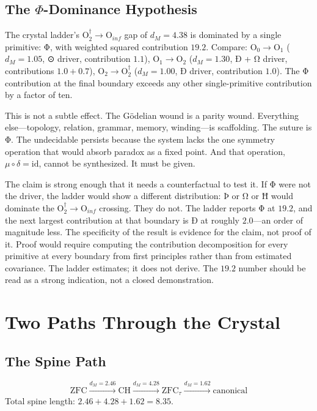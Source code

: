 \documentclass[12pt,twoside]{book}
\theoremstyle{definition}
\newcommand{\ZFCt}{\text{ZFC}_{\tau}}
\newcommand{\moebius}{\mu \circ \delta = \mathrm{id}}
\newcommand{\tier}[1]{\mathrm{O}_{#1}}
\begin{document}
\section{The $\Phi$-Dominance Hypothesis}

The crystal ladder's $\tier{2}^{\dagger} \to \tier{inf}$ gap of $d_M = 4.38$ is dominated
by a single primitive: Φ, with weighted squared contribution $19.2$. Compare:
$\tier{0} \to \tier{1}$ ($d_M = 1.05$, ⊙ driver, contribution $1.1$), $\tier{1} \to
\tier{2}$ ($d_M = 1.30$, Ð + Ω driver, contributions $1.0 + 0.7$), $\tier{2} \to
\tier{2}^{\dagger}$ ($d_M = 1.00$, Ð driver, contribution $1.0$). The Φ contribution at
the final boundary exceeds any other single-primitive contribution by a factor of ten.

This is not a subtle effect. The G\"{o}delian wound is a parity wound. Everything
else---topology, relation, grammar, memory, winding---is scaffolding. The suture is Φ.
The undecidable persists because the system lacks the one symmetry operation that would
absorb paradox as a fixed point. And that operation, $\moebius$, cannot be synthesized. It
must be given.

The claim is strong enough that it needs a counterfactual to test it. If Φ were not the
driver, the ladder would show a different distribution: Þ or Ω or Ħ would dominate the
$\tier{2}^{\dagger} \to \tier{inf}$ crossing. They do not. The ladder reports Φ at $19.2$,
and the next largest contribution at that boundary is Ð at roughly $2.0$---an order of
magnitude less. The specificity of the result is evidence for the claim, not proof of it.
Proof would require computing the contribution decomposition for every primitive at every
boundary from first principles rather than from estimated covariance. The ladder estimates;
it does not derive. The $19.2$ number should be read as a strong indication, not a closed
demonstration.

\chapter{Two Paths Through the Crystal}

\section{The Spine Path}

\begin{equation}
\text{ZFC} \xrightarrow{d_M = 2.46} \text{CH} \xrightarrow{d_M = 4.28} \ZFCt
\xrightarrow{d_M = 1.62} \text{canonical}
\end{equation}
Total spine length: $2.46 + 4.28 + 1.62 = 8.35$.
\end{document}
